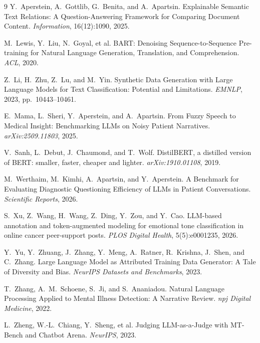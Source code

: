 \documentclass[11pt,a4paper]{article}
\begin{document}
\begin{thebibliography}{9}
\small
{} Y.~Aperstein, A.~Gottlib, G.~Benita, and A.~Apartsin.
\newblock Explainable Semantic Text Relations: A Question-Answering Framework for Comparing Document
Content.
\newblock \emph{Information}, 16(12):1090, 2025.

 M.~Lewis, Y.~Liu, N.~Goyal, et al.
\newblock BART: Denoising Sequence-to-Sequence Pre-training for Natural Language Generation,
Translation, and Comprehension.
\newblock \emph{ACL}, 2020.

 Z.~Li, H.~Zhu, Z.~Lu, and M.~Yin.
\newblock Synthetic Data Generation with Large Language Models for Text Classification: Potential and
Limitations.
\newblock \emph{EMNLP}, 2023, pp.\ 10443--10461.

 E.~Mama, L.~Sheri, Y.~Aperstein, and A.~Apartsin.
\newblock From Fuzzy Speech to Medical Insight: Benchmarking LLMs on Noisy Patient Narratives.
\newblock \emph{arXiv:2509.11803}, 2025.

 V.~Sanh, L.~Debut, J.~Chaumond, and T.~Wolf.
\newblock DistilBERT, a distilled version of BERT: smaller, faster, cheaper and lighter.
\newblock \emph{arXiv:1910.01108}, 2019.

 M.~Werthaim, M.~Kimhi, A.~Apartsin, and Y.~Aperstein.
\newblock A Benchmark for Evaluating Diagnostic Questioning Efficiency of LLMs in Patient Conversations.
\newblock \emph{Scientific Reports}, 2026.

 S.~Xu, Z.~Wang, H.~Wang, Z.~Ding, Y.~Zou, and Y.~Cao.
\newblock LLM-based annotation and token-augmented modeling for emotional tone classification in online
cancer peer-support posts.
\newblock \emph{PLOS Digital Health}, 5(5):e0001235, 2026.

 Y.~Yu, Y.~Zhuang, J.~Zhang, Y.~Meng, A.~Ratner, R.~Krishna, J.~Shen,
and C.~Zhang.
\newblock Large Language Model as Attributed Training Data Generator: A Tale of Diversity and Bias.
\newblock \emph{NeurIPS Datasets and Benchmarks}, 2023.

 T.~Zhang, A.~M.~Schoene, S.~Ji, and S.~Ananiadou.
\newblock Natural Language Processing Applied to Mental Illness Detection: A Narrative Review.
\newblock \emph{npj Digital Medicine}, 2022.

 L.~Zheng, W.-L.~Chiang, Y.~Sheng, et al.
\newblock Judging LLM-as-a-Judge with MT-Bench and Chatbot Arena.
\newblock \emph{NeurIPS}, 2023.
\end{thebibliography}
\end{document}
